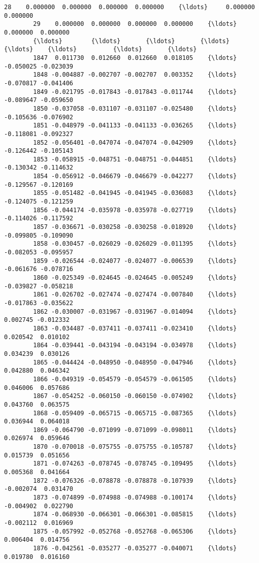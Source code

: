 \documentclass[11pt]{article}
\begin{document}
\begin{Verbatim}[commandchars=\\\{\}]
        28    0.000000  0.000000  0.000000  0.000000    {\ldots}     0.000000  0.000000   
        29    0.000000  0.000000  0.000000  0.000000    {\ldots}     0.000000  0.000000   
        {\ldots}        {\ldots}       {\ldots}       {\ldots}       {\ldots}    {\ldots}          {\ldots}       {\ldots}   
        1847  0.011730  0.012660  0.012660  0.018105    {\ldots}    -0.050025 -0.023039   
        1848 -0.004887 -0.002707 -0.002707  0.003352    {\ldots}    -0.070817 -0.041406   
        1849 -0.021795 -0.017843 -0.017843 -0.011744    {\ldots}    -0.089647 -0.059650   
        1850 -0.037058 -0.031107 -0.031107 -0.025480    {\ldots}    -0.105636 -0.076902   
        1851 -0.048979 -0.041133 -0.041133 -0.036265    {\ldots}    -0.118081 -0.092327   
        1852 -0.056401 -0.047074 -0.047074 -0.042909    {\ldots}    -0.126442 -0.105143   
        1853 -0.058915 -0.048751 -0.048751 -0.044851    {\ldots}    -0.130342 -0.114632   
        1854 -0.056912 -0.046679 -0.046679 -0.042277    {\ldots}    -0.129567 -0.120169   
        1855 -0.051482 -0.041945 -0.041945 -0.036083    {\ldots}    -0.124075 -0.121259   
        1856 -0.044174 -0.035978 -0.035978 -0.027719    {\ldots}    -0.114026 -0.117592   
        1857 -0.036671 -0.030258 -0.030258 -0.018920    {\ldots}    -0.099805 -0.109090   
        1858 -0.030457 -0.026029 -0.026029 -0.011395    {\ldots}    -0.082053 -0.095957   
        1859 -0.026544 -0.024077 -0.024077 -0.006539    {\ldots}    -0.061676 -0.078716   
        1860 -0.025349 -0.024645 -0.024645 -0.005249    {\ldots}    -0.039827 -0.058218   
        1861 -0.026702 -0.027474 -0.027474 -0.007840    {\ldots}    -0.017863 -0.035622   
        1862 -0.030007 -0.031967 -0.031967 -0.014094    {\ldots}     0.002745 -0.012332   
        1863 -0.034487 -0.037411 -0.037411 -0.023410    {\ldots}     0.020542  0.010102   
        1864 -0.039441 -0.043194 -0.043194 -0.034978    {\ldots}     0.034239  0.030126   
        1865 -0.044424 -0.048950 -0.048950 -0.047946    {\ldots}     0.042880  0.046342   
        1866 -0.049319 -0.054579 -0.054579 -0.061505    {\ldots}     0.046006  0.057686   
        1867 -0.054252 -0.060150 -0.060150 -0.074902    {\ldots}     0.043760  0.063575   
        1868 -0.059409 -0.065715 -0.065715 -0.087365    {\ldots}     0.036944  0.064018   
        1869 -0.064790 -0.071099 -0.071099 -0.098011    {\ldots}     0.026974  0.059646   
        1870 -0.070018 -0.075755 -0.075755 -0.105787    {\ldots}     0.015739  0.051656   
        1871 -0.074263 -0.078745 -0.078745 -0.109495    {\ldots}     0.005368  0.041664   
        1872 -0.076326 -0.078878 -0.078878 -0.107939    {\ldots}    -0.002074  0.031470   
        1873 -0.074899 -0.074988 -0.074988 -0.100174    {\ldots}    -0.004902  0.022790   
        1874 -0.068930 -0.066301 -0.066301 -0.085815    {\ldots}    -0.002112  0.016969   
        1875 -0.057992 -0.052768 -0.052768 -0.065306    {\ldots}     0.006404  0.014756   
        1876 -0.042561 -0.035277 -0.035277 -0.040071    {\ldots}     0.019780  0.016160   
        

\end{Verbatim}
\end{document}

